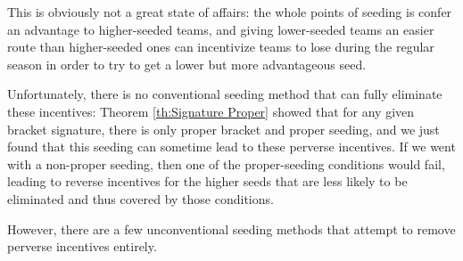 {This is obviously not a great state of affairs: the whole points of seeding is confer an advantage to higher-seeded teams, and giving lower-seeded teams an easier route than higher-seeded ones can incentivize teams to lose during the regular season in order to try to get a lower but more advantageous seed.

Unfortunately, there is no conventional seeding method that can fully eliminate these incentives: Theorem \ref{th:Signature Proper} showed that for any given bracket signature, there is only proper bracket and proper seeding, and we just found that this seeding can sometime lead to these perverse incentives. If we went with a non-proper seeding, then one of the proper-seeding conditions would fail, leading to reverse incentives for the higher seeds that are less likely to be eliminated and thus covered by those conditions.

However, there are a few unconventional seeding methods that attempt to remove perverse incentives entirely.

}
